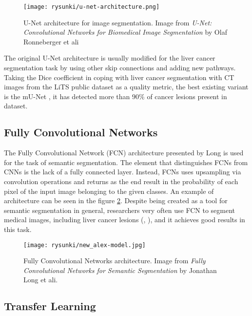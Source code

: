 \begin{figure}[!h]
	\centering \texttt{[image: rysunki/u-net-architecture.png]}
	\caption{U-Net architecture for image segmentation. Image from \textit{U-Net: Convolutional Networks for Biomedical Image Segmentation} by Olaf Ronneberger et ali} 
	\label{rys:u_net_arch}
\end{figure}

The original U-Net architecture is usually modified for the liver cancer segmentation task by using other skip connections and adding new pathways. Taking the Dice coefficient in coping with liver cancer segmentation with CT images from the LiTS public dataset \cite{bilic_liver_2023} as a quality metric, the best existing variant is the mU-Net \cite{seo_modified_2020}, it has detected more than $90\%$ of cancer lesions present in dataset.

\subsection{Fully Convolutional Networks}

The Fully Convolutional Network (FCN) architecture presented by Long \cite{long_fully_nodate} is used for the task of semantic segmentation. The element that distinguishes FCNs from CNNs is the lack of a fully connected layer. Instead, FCNs uses upsampling via convolution operations and returns as the end result in the probability of each pixel of the input image belonging to the given classes. An example of architecture can be seen in the figure \ref{rys:fcn_arch}. Despite being created as a tool for semantic segmentation in general, researchers very often use FCN to segment medical images, including liver cancer lesions (\cite{christ_automatic_2017}, \cite{carneiro_fully_2016}), and it achieves good results in this task.

\begin{figure}[!h]
	\centering \texttt{[image: rysunki/new\_alex-model.jpg]}
	\caption{Fully Convolutional Networks architecture. Image from \textit{Fully Convolutional Networks for Semantic Segmentation} by Jonathan Long et ali. } 
	\label{rys:fcn_arch}
\end{figure}

\subsection{Transfer Learning}

